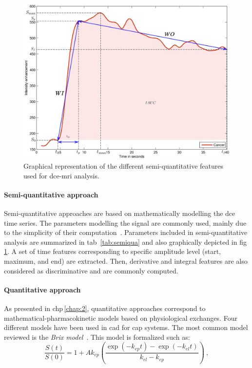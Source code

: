 \begin{figure}
  \centering
  \includegraphics[width=.8\linewidth]{3_review/figures/feature-detection/dce/dce_cancer_parameters.eps}
  \caption[Semi-quantitative features used for \acs*{dce}-\acs*{mri}.]{Graphical representation of the different semi-quantitative features used for \acs*{dce}-\acs*{mri} analysis.}
  \label{fig:dceparam}
\end{figure}

\paragraph{Semi-quantitative approach}
Semi-quantitative approaches are based on mathematically modelling the \ac{dce} time series.
The parameters modelling the signal are commonly used, mainly due to the simplicity of their computation~\cite{Puech2009,Mazzetti2011,Niaf2011,Niaf2012,Sung2011,trigui2016classification,trigui2017automatic,lehaire2014computer,samarasinghe2016semi,giannini2015fully}.
Parameters included in semi-quantitative analysis are summarized in \acs{tab}~\ref{tab:semiqua} and also graphically depicted in \acs{fig}\,\ref{fig:dceparam}.
A set of time features corresponding to specific amplitude level (start, maximum, and end) are extracted.
Then, derivative and integral features are also considered as discriminative and are commonly computed.

\paragraph{Quantitative approach}
As presented in \acs{chp}\,\ref{chap:2}, quantitative approaches correspond to mathematical-pharmacokinetic models based on physiological exchanges.
Four different models have been used in \ac{cad} for \ac{cap} systems.
The most common model reviewed is the \textit{Brix model}~\cite{Artan2009,Artan2010,Sung2011,Liu2009,Ozer2009,Ozer2010}.
This model is formalized such as:
\begin{equation}
	\frac{S(t)}{S(0)} = 1 + A k_{ep} \left( \frac{\exp( -k_{ep} t ) - \exp( -k_{el} t )}{k_{el} - k_{ep}} \right) \ ,
	\label{eq:brixmod}
\end{equation}

